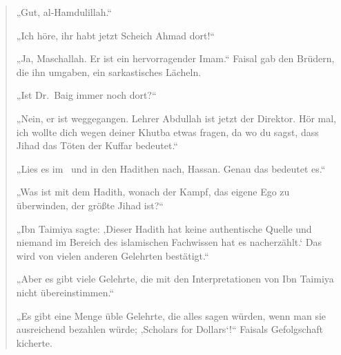 \documentclass[12pt]{memoir}
\begin{document}
\begin{quote}
„Gut, al-Hamdulillah.“

„Ich höre, ihr habt jetzt Scheich Ahmad dort!“

„Ja, Maschallah.
Er ist ein hervorragender Imam.“
Faisal gab den Brüdern, die ihn umgaben, ein sarkastisches Lächeln.

„Ist Dr.\ Baig immer noch dort?“

„Nein, er ist weggegangen.
Lehrer Abdullah ist jetzt der Direktor.
Hör mal, ich wollte dich wegen deiner Khutba etwas fragen,
da wo du sagst, dass Jihad das Töten der Kuffar bedeutet.“

„Lies es im \Quran\ und in den Hadithen nach, Hassan.
Genau das bedeutet es.“

„Was ist mit dem Hadith, wonach der Kampf, das eigene Ego zu überwinden,
der größte Jihad ist?“

„Ibn Taimiya sagte:
‚Dieser Hadith hat keine authentische Quelle und niemand
im Bereich des islamischen Fachwissen hat es nacherzählt.‘
Das wird von vielen anderen Gelehrten bestätigt.“

„Aber es gibt viele Gelehrte,
die mit den Interpretationen von Ibn Taimiya nicht übereinstimmen.“

„Es gibt eine Menge üble Gelehrte,
die alles sagen würden, wenn man sie ausreichend bezahlen würde;
‚Scholars for Dollars‘!“
Faisals Gefolgschaft kicherte.
\end{quote}
\end{document}
